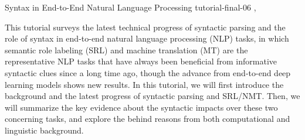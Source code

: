 \begin{tutorial}
  {Syntax in End-to-End Natural Language Processing}
  {tutorial-final-06}
  {\daydateyear, \tutorialmorningtime}
  {\TutLocA}

This tutorial surveys the latest technical progress of syntactic parsing and the role of syntax in end-to-end natural language processing (NLP) tasks, in which semantic role labeling (SRL) and machine translation (MT) are the representative NLP tasks that have always been beneficial from informative syntactic clues since a long time ago, though the advance from end-to-end deep learning models shows new results. In this tutorial, we will first introduce the background and the latest progress of syntactic parsing and SRL/NMT. Then, we will summarize the key evidence about the syntactic impacts over these two concerning tasks, and explore the behind reasons from both computational and linguistic background.

\end{tutorial}
